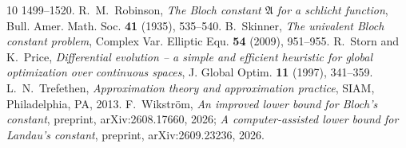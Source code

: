\documentclass[11pt]{amsart}
\theoremstyle{remark}
\begin{document}
\begin{thebibliography}{10}
1499--1520.
 R.~M.~Robinson, \emph{The Bloch constant $\mathfrak A$ for a schlicht function}, Bull. Amer. Math.
Soc. \textbf{41} (1935), 535--540.
 B.~Skinner, \emph{The univalent Bloch constant problem}, Complex Var. Elliptic Equ. \textbf{54}
(2009), 951--955.
 R.~Storn and K.~Price, \emph{Differential evolution -- a simple and efficient heuristic for global
optimization over continuous spaces}, J. Global Optim. \textbf{11} (1997), 341--359.
 L.~N.~Trefethen, \emph{Approximation theory and approximation practice}, SIAM, Philadelphia, PA,
2013.
 F.~Wikstr\"om, \emph{An improved lower bound for Bloch's constant}, preprint, arXiv:2608.17660, 2026;
\emph{A computer-assisted lower bound for Landau's constant}, preprint, arXiv:2609.23236, 2026.
\end{thebibliography}
\end{document}
